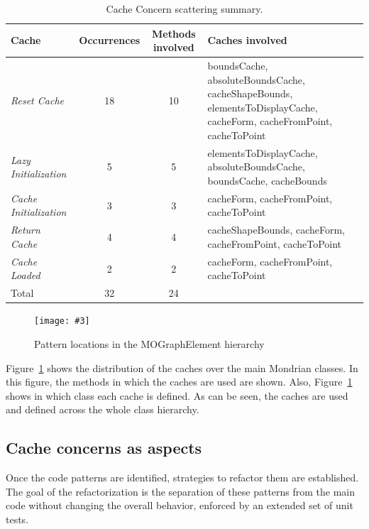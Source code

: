 \documentclass[preprint,10pt]{sigplanconf}
\newcommand{\largefig}[4]{
	\begin{figure}[#1]
		\centering
		\texttt{[image: \#3]}
		\caption{\label{fig:#3}#4}
	\end{figure}}
\newcommand{\figref}[1]{Figure~\ref{fig:#1}\xspace}
\begin{document}
%
\begin{table}
\begin{centering}
\begin{tabular}{|p{2.5cm}|c|c|p{3.5cm}|}
\hline 
Cache  & Occurrences  & Methods involved  & Caches involved\tabularnewline
\hline
\hline 
\emph{Reset Cache}  & 18 & 10 & boundsCache, absoluteBoundsCache, cacheShapeBounds, elementsToDisplayCache,
cacheForm, cacheFromPoint, cacheToPoint\tabularnewline
\hline 
\emph{Lazy Initialization}  & 5 & 5 & elementsToDisplayCache, absoluteBoundsCache, boundsCache, cacheBounds\tabularnewline
\hline 
\emph{Cache Initialization}  & 3 & 3 & cacheForm, cacheFromPoint, cacheToPoint\tabularnewline
\hline 
\emph{Return Cache}  & 4 & 4 & cacheShapeBounds, cacheForm, cacheFromPoint, cacheToPoint\tabularnewline
\hline 
\emph{Cache Loaded} & 2 & 2 & cacheForm, cacheFromPoint, cacheToPoint\tabularnewline
\hline 
Total  & 32 & 24 & \multicolumn{1}{c}{}\tabularnewline
\cline{1-3} 
\end{tabular}
\par\end{centering}

\caption{Cache Concern scattering summary.\label{tab:Cache-Concern-scattering}}

\end{table}

\largefig{}{0.6}{PatternLocation}{Pattern locations in the MOGraphElement hierarchy}


\figref{PatternLocation} shows the distribution of the caches over the main Mondrian classes. In this figure, the methods in which the caches are used are shown. Also, \figref{PatternLocation} shows in which class each cache is defined. As can be seen, the caches are used and defined across the whole class hierarchy.

\subsection{Cache concerns as aspects}

Once the code patterns are identified, strategies to refactor them
are established. The goal of the refactorization is the separation of these patterns from the main code without changing the overall behavior, enforced by an extended set of unit tests.
\end{document}
